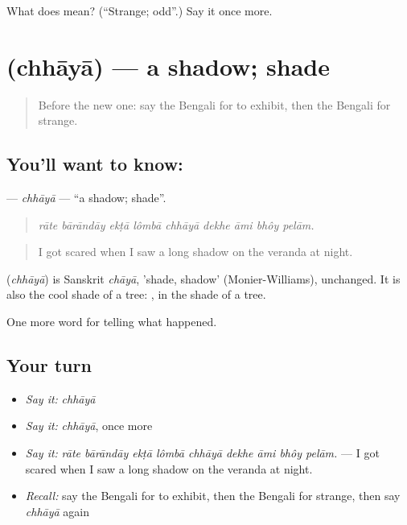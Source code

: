 \begin{tcolorbox}[breakable,colback=teal!4,colframe=teal!35!black,title={Before you move on}]
What does  mean? (\textquotedblleft{}Strange; odd\textquotedblright{}.) Say it once more.
\end{tcolorbox}
\section[\texorpdfstring{\bn{ছায়া} (chhāyā)}{ছায়া (chhāyā)}]{ (chhāyā) — a shadow; shade}

\label{lesson:BN-C286-chhaya}



\begin{quote}
Before the new one: say the Bengali for to exhibit, then the Bengali for strange.
\end{quote}

\subsection*{You'll want to know: }
\textbf{} — \emph{chhāyā} — \textquotedblleft{}a shadow; shade\textquotedblright{}.

\begin{quote}
        
\end{quote}

\begin{quote}
\emph{rāte bārāndāy ekṭā lômbā chhāyā dekhe āmi bhôy pelām.}
\end{quote}

\begin{quote}
I got scared when I saw a long shadow on the veranda at night.
\end{quote}

\begin{cousinweb}
\textbf{} (\emph{chhāyā}) is Sanskrit \emph{chāyā}, 'shade, shadow' (Monier-Williams), unchanged. It is also the cool shade of a tree:  , in the shade of a tree.
\end{cousinweb}

\begin{grammarlens}[title={What you've built}]
One more word for telling what happened.
\end{grammarlens}

\subsection*{Your turn}
\begin{itemize}
\raggedright
  \item \emph{Say it:} \emph{chhāyā}
  \item \emph{Say it:} \emph{chhāyā}, once more
  \item \emph{Say it:} \emph{rāte bārāndāy ekṭā lômbā chhāyā dekhe āmi bhôy pelām.} — I got scared when I saw a long shadow on the veranda at night.
  \item \emph{Recall:} say the Bengali for to exhibit, then the Bengali for strange, then say \emph{chhāyā} again
\end{itemize}

